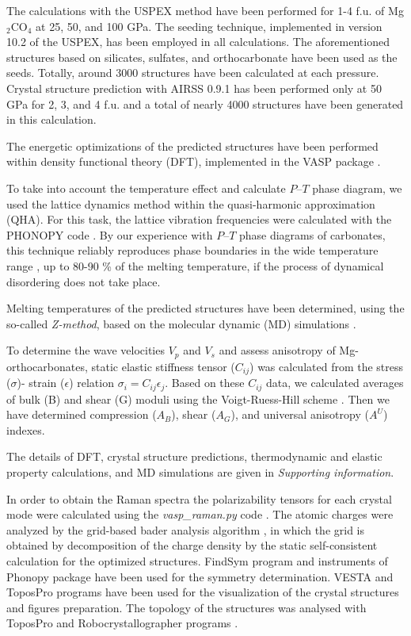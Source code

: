\documentclass[a4paperm]{article}
\begin{document}
The calculations with the USPEX method \cite{uspex1,uspex2,uspex3,uspex_topology} have been performed for 1-4 f.u. of Mg$_2$CO$_4$ at 25, 50, and 100 GPa.
The seeding technique, implemented in version 10.2 of the USPEX, has been employed in all calculations.
The aforementioned structures based on silicates, sulfates, and orthocarbonate have been used as the seeds.
Totally, around 3000 structures have been calculated at each pressure.
Crystal structure prediction with AIRSS 0.9.1 \cite{airss1,airss2} has been performed only at 50 GPa for 2, 3, and 4 f.u. and a total of nearly 4000 structures have been generated in this calculation.

The energetic optimizations of the predicted structures have been performed within density functional theory (DFT), implemented in the VASP package \cite{vasp1,vasp2}.

To take into account the temperature effect and calculate $P$--$T$ phase diagram, we used the lattice dynamics method within the quasi-harmonic approximation (QHA).
For this task, the lattice vibration frequencies were calculated with the PHONOPY code \cite{phonopy}.
By our experience with $P$--$T$ phase diagrams of carbonates, this technique reliably reproduces phase boundaries in the wide temperature range \cite{gavr2019_alk, gavr2020_disarag, sagatova2020_ortho}, up to 80-90 \% of the melting temperature, if the process of dynamical disordering does not take place.

Melting temperatures of the predicted structures have been determined, using the so-called {\it Z-method}, based on the molecular dynamic (MD) simulations \cite{z-method}.

To determine the wave velocities $V_p$ and $V_s$ and assess anisotropy of Mg-orthocarbonates, static elastic stiffness tensor ($C_{ij}$) was calculated from the stress ($\sigma$)- strain ($\epsilon$) relation $\sigma_i=C_{ij}\epsilon_j$.
Based on these $C_{ij}$ data, we calculated averages of bulk (B) and shear (G) moduli using the Voigt-Ruess-Hill scheme \cite{hill1952,hill1963}.
 Then we have determined compression ($A_B$), shear ($A_G$), and universal anisotropy ($A^U$) indexes.

The details of DFT, crystal structure predictions, thermodynamic and elastic property calculations, and MD simulations are given in {\it Supporting information}.

In order to obtain the Raman spectra the polarizability tensors for each crystal mode were calculated using the \textit{vasp{\_}raman.py} code \cite{vasp_raman}. The atomic charges were analyzed by the grid-based bader analysis algorithm \cite{bader_1,bader_2}, in which the grid is obtained by decomposition of the charge density by the static self-consistent calculation for the optimized structures.
FindSym program \cite{stokes2005} and instruments of Phonopy package have been used for the symmetry determination.
VESTA and ToposPro \cite{vesta,topos} programs have been used for the visualization of the crystal structures and figures preparation.
The topology of the structures was analysed with ToposPro and Robocrystallographer programs \cite{topos,robocrys}.
 
\end{document}
